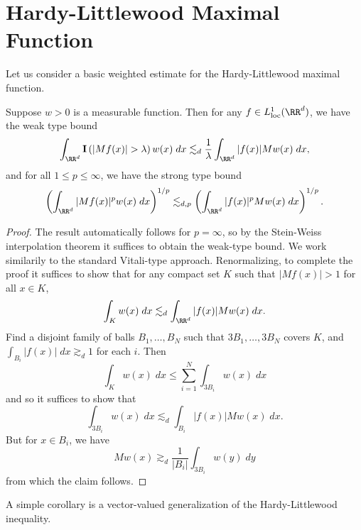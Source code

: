 \section{Hardy-Littlewood Maximal Function}

Let us consider a basic weighted estimate for the Hardy-Littlewood maximal function.

\begin{theorem}
  Suppose $w > 0$ is a measurable function. Then for any $f \in L^1_{\text{loc}}(\RR^d)$, we have the weak type bound
  \[ \int_{\RR^d} \mathbf{I} \left( |Mf(x)| > \lambda \right) w(x)\; dx \lesssim_d \frac{1}{\lambda} \int_{\RR^d} |f(x)| Mw(x)\; dx, \]
  and for all $1 \leq p \leq \infty$, we have the strong type bound
  \[ \left( \int_{\RR^d} |Mf(x)|^p w(x)\; dx \right)^{1/p} \lesssim_{d,p} \left( \int_{\RR^d} |f(x)|^p Mw(x)\; dx \right)^{1/p}. \]
\end{theorem}
\begin{proof}
  The result automatically follows for $p = \infty$, so by the Stein-Weiss interpolation theorem it suffices to obtain the weak-type bound. We work similarily to the standard Vitali-type approach. Renormalizing, to complete the proof it suffices to show that for any compact set $K$ such that $|Mf(x)| > 1$ for all $x \in K$,
  \[ \int_K w(x)\; dx \lesssim_d \int_{\RR^d} |f(x)| Mw(x)\; dx. \]
  Find a disjoint family of balls $B_1,\dots,B_N$ such that $3B_1,\dots,3B_N$ covers $K$, and $\int_{B_i} |f(x)|\; dx \gtrsim_d 1$ for each $i$. Then
  \[ \int_K w(x)\; dx \leq \sum_{i = 1}^N \int_{3B_i} w(x)\; dx \]
  and so it suffices to show that
  \[ \int_{3B_i} w(x)\; dx \lesssim_d \int_{B_i} |f(x)| Mw(x)\; dx. \]
  But for $x \in B_i$, we have
  \[ Mw(x) \gtrsim_d \frac{1}{|B_i|} \int_{3B_i} w(y)\; dy \]
  from which the claim follows.
\end{proof}

A simple corollary is a vector-valued generalization of the Hardy-Littlewood inequality.

